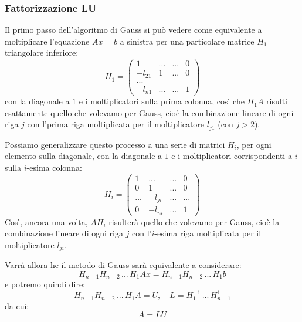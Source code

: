 \documentclass[a4paper,11pt]{article}
\begin{document}
\subsubsection{Fattorizzazione LU}
Il primo passo dell'algoritmo di Gauss si può vedere come equivalente a moltiplicare l'equazione $Ax = b$ a sinistra per una particolare matrice $H_1$ triangolare inferiore:
$$
H_1 = \begin{pmatrix}
	1 & ... & ... & 0 \\
	-l_{21} & 1 & ... & 0 \\
	... \\ 
	-l_{n1} & ... & ... & 1
\end{pmatrix}
$$
con la diagonale a $1$ e i moltiplicatori sulla prima colonna, così che $H_1 A$ risulti esattamente quello che volevamo per Gauss, cioè la combinazione lineare di ogni riga $j$ con l'prima riga moltiplicata per il moltiplicatore $l_{j1}$ (con $j > 2$).

Possiamo generalizzare questo processo a una serie di matrici $H_i$, per ogni elemento sulla diagonale, con la diagonale a $1$ e i moltiplicatori corrispondenti a $i$ sulla $i$-esima colonna:
$$
H_i = \begin{pmatrix}
	1 & ... & ... & 0 \\
	0 & 1 & ... & 0 \\
	... & -l_{ji} & ... & ... \\
	0 & -l_{ni} & ... & 1
\end{pmatrix}
$$
Così, ancora una volta, $A H_i$ risulterà quello che volevamo per Gauss, cioè la combinazione lineare di ogni riga $j$ con l'$i$-esima riga moltiplicata per il moltiplicatore $l_{ji}$.

Varrà allora he il metodo di Gauss sarà equivalente a considerare:
$$
H_{n - 1} H_{n - 2} \, ... \, H_1 A x = H_{n - 1} H_{n - 2} \, ... \, H_1 b
$$
e potremo quindi dire:
$$
H_{n - 1} H_{n - 2} \, ... \, H_1 A = U, \quad L = H_1^{-1} \, ... \, H_{n - 1}^1 
$$
da cui:
$$
A = LU
$$
\end{document}
